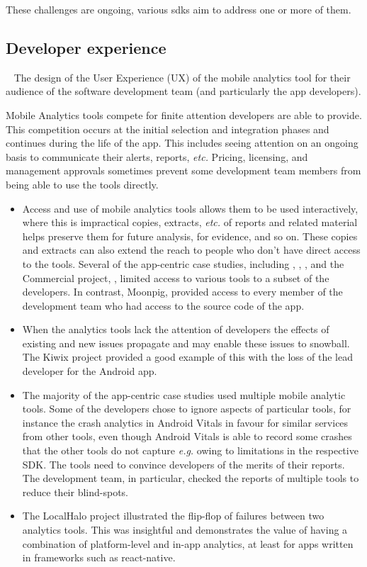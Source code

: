 These challenges are ongoing, various \Glspl{sdk} aim to address one or more of them.

\subsection{Developer experience}~\label{tata-developer-experience-ux-design}
The design of the User Experience (UX) of the mobile analytics tool for their audience of the software development team (and particularly the app developers).

Mobile Analytics tools compete for finite attention developers are able to provide. This competition occurs at the initial selection and integration phases and continues during the life of the app. This includes seeing attention on an ongoing basis  to communicate their alerts, reports, \emph{etc.} Pricing, licensing, and management approvals sometimes prevent some development team members from being able to use the tools directly.

\begin{itemize}
    \itemsep0em
    \item Access and use of mobile analytics tools allows them to be used interactively, where this is impractical copies, extracts, \emph{etc.} of reports and related material helps  preserve them for future analysis, for evidence, and so on. These copies and extracts can also extend the reach to people who don't have direct access to the tools. Several of the app-centric case studies, including , , , and the Commercial project, , limited access to various tools to a subset of the developers. In contrast, Moonpig, provided access to every member of the development team who had access to the source code of the app.
    \item When the analytics tools lack the attention of developers the effects of existing and new issues propagate and may enable these issues to snowball. The Kiwix project provided a good example of this with the loss of the lead developer for the Android app.
    \item The majority of the app-centric case studies used multiple mobile analytic tools. Some of the developers chose to ignore aspects of particular tools, for instance the crash analytics in Android Vitals in favour for similar services from other tools, even though Android Vitals is able to record some crashes that the other tools do not capture \emph{e.g.} owing to limitations in the respective SDK. The tools need to convince developers of the merits of their reports. The  development team, in particular, checked the reports of multiple tools to reduce their blind-spots.
    \item The LocalHalo project illustrated the flip-flop of failures between two analytics tools. This was insightful and demonstrates the value of having a combination of platform-level and in-app analytics, at least for apps written in frameworks such as react-native.
\end{itemize}

